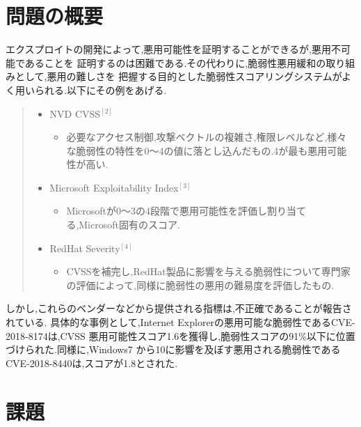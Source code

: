 \documentclass[submit,techreq,noauthor]{eco}	%
\begin{document}
\section{問題の概要}
エクスプロイトの開発によって,悪用可能性を証明することができるが,悪用不可能であることを
証明するのは困難である.その代わりに,脆弱性悪用緩和の取り組みとして,悪用の難しさを
把握する目的とした脆弱性スコアリングシステムがよく用いられる.以下にその例をあげる.\\
\begin{quote}
  \begin{itemize}
   \item NVD CVSS\begin{math}^{[2]}\end{math}
    \begin{itemize}
      \item 必要なアクセス制御,攻撃ベクトルの複雑さ,権限レベルなど,様々な脆弱性の特性を0～4の値に落とし込んだもの.4が最も悪用可能性が高い.
    \end{itemize}
   \item Microsoft Exploitability Index\begin{math}^{[3]}\end{math}
    \begin{itemize}
      \item Microsoftが0〜3の4段階で悪用可能性を評価し割り当てる,Microsoft固有のスコア.
    \end{itemize}
   \item RedHat Severity\begin{math}^{[4]}\end{math}
    \begin{itemize}
      \item CVSSを補完し,RedHat製品に影響を与える脆弱性について専門家の評価によって,同様に脆弱性の悪用の難易度を評価したもの.\\
    \end{itemize}
  \end{itemize}
\end{quote}
しかし,これらのベンダーなどから提供される指標は,不正確であることが報告されている.
具体的な事例として,Internet Explorerの悪用可能な脆弱性であるCVE-2018-8174は,CVSS
悪用可能性スコア1.6を獲得し,脆弱性スコアの91\%以下に位置づけられた.同様に,Windows7
から10に影響を及ぼす悪用される脆弱性であるCVE-2018-8440は,スコアが1.8とされた.


\section{課題}
\end{document}
